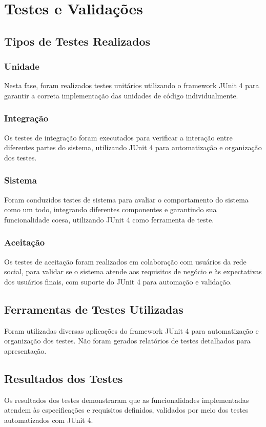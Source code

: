 \documentclass[../main.tex]{subfiles}
\begin{document}
\section{Testes e Validações}

\subsection{Tipos de Testes Realizados}

\subsubsection{Unidade}
Nesta fase, foram realizados testes unitários utilizando o framework JUnit 4 para garantir a correta implementação das unidades de código individualmente.

\subsubsection{Integração}
Os testes de integração foram executados para verificar a interação entre diferentes partes do sistema, utilizando JUnit 4 para automatização e organização dos testes.

\subsubsection{Sistema}
Foram conduzidos testes de sistema para avaliar o comportamento do sistema como um todo, integrando diferentes componentes e garantindo sua funcionalidade coesa, utilizando JUnit 4 como ferramenta de teste.

\subsubsection{Aceitação}
Os testes de aceitação foram realizados em colaboração com usuários da rede social, para validar se o sistema atende aos requisitos de negócio e às expectativas dos usuários finais, com suporte do JUnit 4 para automação e validação.

\subsection{Ferramentas de Testes Utilizadas}
Foram utilizadas diversas aplicações do framework JUnit 4 para automatização e organização dos testes. Não foram gerados relatórios de testes detalhados para apresentação.

\subsection{Resultados dos Testes}
Os resultados dos testes demonstraram que as funcionalidades implementadas atendem às especificações e requisitos definidos, validados por meio dos testes automatizados com JUnit 4.
\end{document}
